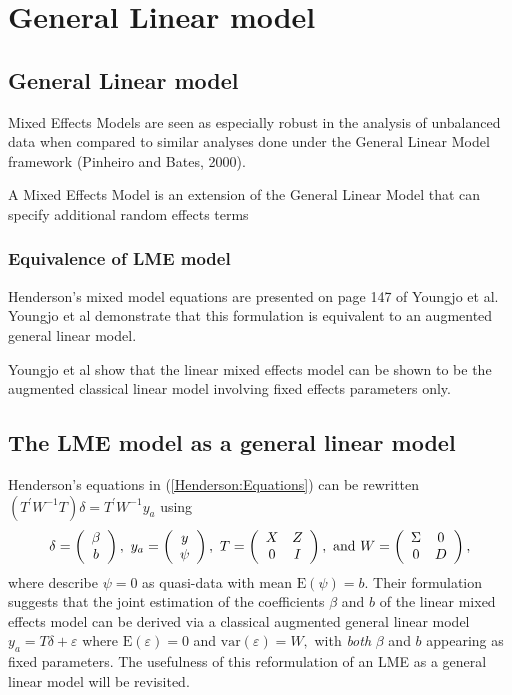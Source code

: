 \documentclass[12pt, a4paper]{article}
\begin{document}



\chapter{General Linear model}
\section{General Linear model} Mixed Effects Models are seen as
especially robust in the analysis of unbalanced data when compared
to similar analyses done under the General Linear Model framework
(Pinheiro and Bates, 2000).

A Mixed Effects Model is an extension of the General Linear Model
that can specify additional random effects terms




\subsection{Equivalence of LME model}
Henderson's mixed model equations are presented on page 147 of
Youngjo et al. Youngjo et al demonstrate that this formulation is
equivalent to an augmented general linear model.

Youngjo et al show that the linear mixed effects model can be
shown to be the augmented classical linear model involving fixed
effects parameters only.
\section{The LME model as a general linear model}
Henderson's equations in (\ref{Henderson:Equations}) can be rewritten $( T^\prime W^{-1} T ) \delta = T^\prime W^{-1} y_{a} $ using
\[
\delta = \left(\begin{array}{c}\beta \\ b \end{array}\right),
\ y_{a} = \left(\begin{array}{c}
y \cr \psi
\end{array}\right),
\ T = \left(\begin{array}{cc}
X & Z  \\
0 & I
\end{array}\right),
\ \textrm{and} \ W = \left(\begin{array}{cc}
\Sigma & 0  \cr
0 &  D \end{array}\right),
\]
where \cite{Lee:Neld:Pawi:2006} describe $\psi = 0$ as quasi-data with mean $\mathrm{E}(\psi) = b.$ Their formulation suggests that the joint estimation of the coefficients $\beta$ and $b$ of the linear mixed effects model can be derived via a classical augmented general linear model $y_{a} = T\delta + \varepsilon$ where $\mathrm{E}(\varepsilon) = 0$ and $\mathrm{var}(\varepsilon) = W,$ with \emph{both} $\beta$ and $b$ appearing as fixed parameters. The usefulness of this reformulation of an LME as a general linear model will be revisited.
\end{document}
